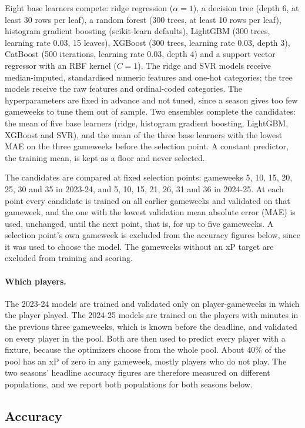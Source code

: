 \documentclass[12pt,oneside,a4paper]{book}
\theoremstyle{definition}
\theoremstyle{remark}
\begin{document}
	Eight base learners compete: ridge regression ($\alpha=1$), a decision tree (depth 6, at least
	30 rows per leaf), a random forest (300 trees, at least 10 rows per leaf), histogram gradient
	boosting (scikit-learn defaults), LightGBM (300 trees, learning rate 0.03, 15 leaves), XGBoost
	(300 trees, learning rate 0.03, depth 3), CatBoost (500 iterations, learning rate 0.03, depth 4)
	and a support vector regressor with an RBF kernel ($C=1$). The ridge and SVR models receive
	median-imputed, standardised numeric features and one-hot categories; the tree models receive
	the raw features and ordinal-coded categories. The hyperparameters are fixed in advance and
	not tuned, since a season gives too few gameweeks to tune them out of sample. Two ensembles
	complete the candidates: the mean of five base learners (ridge, histogram gradient boosting,
	LightGBM, XGBoost and SVR), and the mean of the three base learners with the lowest MAE on the
	three gameweeks before the selection point. A constant predictor, the training mean, is kept as
	a floor and never selected.

	The candidates are compared at fixed selection points: gameweeks 5, 10, 15, 20, 25, 30 and 35
	in 2023-24, and 5, 10, 15, 21, 26, 31 and 36 in 2024-25. At each point every candidate is
	trained on all earlier gameweeks and validated on that gameweek, and the one with the lowest
	validation mean absolute error (MAE) is used, unchanged, until the next point, that is, for up
	to five gameweeks. A selection point's own gameweek is excluded from the accuracy figures below,
	since it was used to choose the model. The gameweeks without an xP target are excluded from
	training and scoring.

	\paragraph{Which players.} The 2023-24 models are trained and validated only on player-gameweeks
	in which the player played. The 2024-25 models are trained on the players with minutes in the
	previous three gameweeks, which is known before the deadline, and validated on every player in
	the pool. Both are then used to predict every player with a fixture, because the optimizers
	choose from the whole pool. About 40\% of the pool has an xP of zero in any gameweek, mostly
	players who do not play. The two seasons' headline accuracy figures are therefore measured on
	different populations, and we report both populations for both seasons below.

	\subsection{Accuracy}
	\label{sec:predictions-accuracy}
\end{document}
